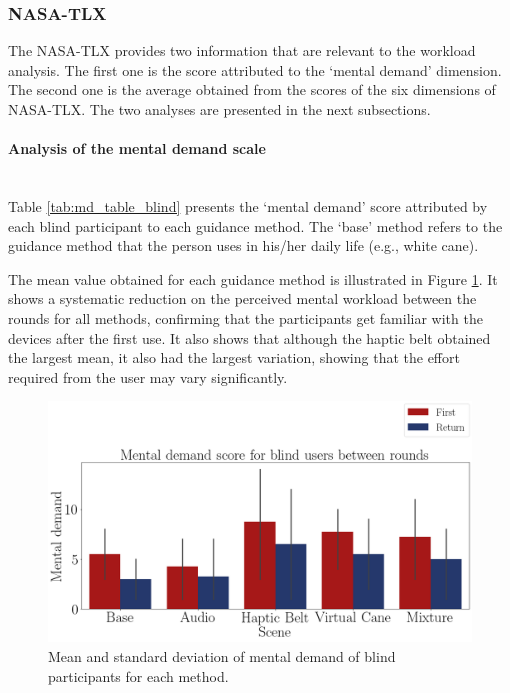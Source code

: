 \subsubsection{NASA-TLX}
\label{subsubsec:results_nasa_tlx_1}

The NASA-TLX provides two information that are relevant to the workload analysis. The first one is the score attributed to the ‘mental demand’ dimension. The second one is the average obtained from the scores of the six dimensions of NASA-TLX. The two analyses are presented in the next subsections.

\paragraph{Analysis of the mental demand scale}\mbox{}\\

Table \ref{tab:md_table_blind} presents the ‘mental demand’ score attributed by each blind participant to each guidance method. The ‘base’ method refers to the guidance method that the person uses in his/her daily life (e.g., white cane). 



The mean value obtained for each guidance method is illustrated in Figure \ref{fig:barplot_md_avg_5_scene_blind}. It shows a systematic reduction on the perceived mental workload between the rounds for all methods, confirming that the participants get familiar with the devices after the first use. It also shows that although the haptic belt obtained the largest mean, it also had the largest variation, showing that the effort required from the user may vary significantly.

\begin{figure}[!htb]
    \centering
    \includegraphics[width = 0.8\linewidth]{Resultados/Nasa/Figuras/png/barplot_md_avg_5_scene_blind.png}
    \caption{Mean and standard deviation of mental demand of blind participants for each method.}
    \label{fig:barplot_md_avg_5_scene_blind}
\end{figure}

